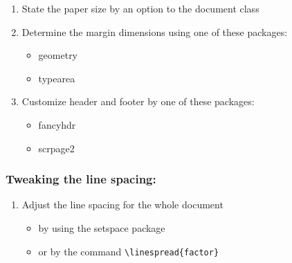 \documentclass{article}
\begin{document}
\begin{enumerate}
  \item State the paper size by an option to the document class
  \item Determine the margin dimensions using one of these packages:
  \begin{itemize}
    \item geometry
    \item typearea
  \end{itemize}
  \item Customize header and footer by one of these packages:
  \begin{itemize}
    \item fancyhdr
    \item scrpage2
  \end{itemize}
\end{enumerate}
\subsubsection*{Tweaking the line spacing:}
\begin{enumerate}[resume*] 
  \item Adjust the line spacing for the whole document
  \begin{itemize}
    \item by using the setspace package
    \item or by the command \verb|\linespread{factor}|
  \end{itemize}
\end{enumerate}
\end{document}
